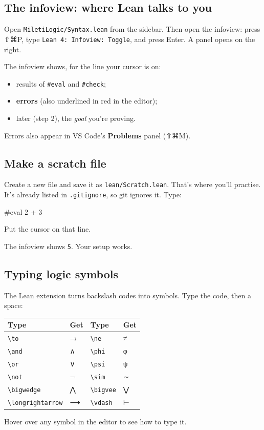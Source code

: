 \documentclass[11pt,a4paper]{article}
\newcommand{\code}[1]{\texttt{#1}}
\begin{document}
\subsection{The infoview: where Lean talks to you}
Open \code{MiletiLogic/Syntax.lean} from the sidebar. Then open the infoview: press ⇧⌘P, type \code{Lean 4: Infoview: Toggle}, and press Enter. A panel opens on the right.

The infoview shows, for the line your cursor is on:
\begin{itemize}
\item results of \code{\#eval} and \code{\#check};
\item \textbf{errors} (also underlined in red in the editor);
\item later (step 2), the \emph{goal} you're proving.
\end{itemize}
Errors also appear in VS Code's \textbf{Problems} panel (⇧⌘M).

\subsection{Make a scratch file}
Create a new file and save it as \code{lean/Scratch.lean}. That's where you'll practise. It's already listed in \code{.gitignore}, so git ignores it. Type:
\begin{lean}
#eval 2 + 3
\end{lean}
Put the cursor on that line.
\begin{okbox}
The infoview shows \code{5}. Your setup works.
\end{okbox}

\subsection{Typing logic symbols}
The Lean extension turns backslash codes into symbols. Type the code, then a space:
\begin{center}
\begin{tabular}{@{}llll@{}}
\toprule
\textbf{Type} & \textbf{Get} & \textbf{Type} & \textbf{Get}\\
\midrule
\code{\textbackslash to} & → & \code{\textbackslash ne} & ≠\\
\code{\textbackslash and} & ∧ & \code{\textbackslash phi} & φ\\
\code{\textbackslash or} & ∨ & \code{\textbackslash psi} & ψ\\
\code{\textbackslash not} & ¬ & \code{\textbackslash sim} & ∼\\
\code{\textbackslash bigwedge} & ⋀ & \code{\textbackslash bigvee} & ⋁\\
\code{\textbackslash longrightarrow} & ⟶ & \code{\textbackslash vdash} & ⊢\\
\bottomrule
\end{tabular}
\end{center}
Hover over any symbol in the editor to see how to type it.
\end{document}
